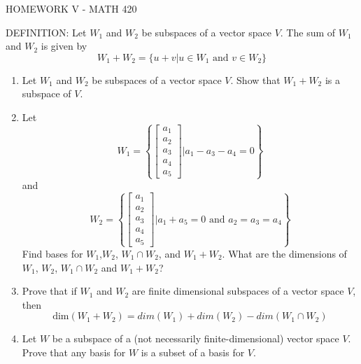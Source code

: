 \documentclass{article}
\begin{document}
\centerline{HOMEWORK V - MATH 420}
\noindent
DEFINITION:  Let $W_1$ and $W_2$ be subspaces of a vector space $V$.  The sum of $W_1$ and $W_2$ is given by $$W_1+W_2=\{u+v|u\in W_1 \mbox{ and } v\in W_2\}$$

\begin{enumerate}

\item
Let $W_1$ and $W_2$ be subspaces of a vector space $V$.  Show that $W_1+W_2$ is a subspace of $V$.
\item Let
$$W_1=\left\{\left[\begin{array}{c}a_1\\a_2\\a_3\\a_4\\a_5\end{array}\right] | a_1-a_3-a_4=0\right\}$$
and
$$W_2=\left\{\left[\begin{array}{c}a_1\\a_2\\a_3\\a_4\\a_5\end{array}\right] | a_1+a_5=0 \mbox{ and } a_2=a_3=a_4\right\}$$
Find bases for $W_1$,$W_2$, $W_1\cap W_2$, and $W_1+W_2$.
What are the dimensions of $W_1$, $W_2$, $W_1\cap W_2$ and $W_1+W_2$?

\item  Prove that if $W_1$ and $W_2$ are finite dimensional subspaces of a vector space $V$, then $$\mbox{dim}(W_1+W_2)=dim(W_1)+dim(W_2)-dim(W_1\cap W_2)$$

\item Let $W$ be a subspace of a (not necessarily finite-dimensional) vector space $V$. Prove that any basis for $W$ is a subset of a basis for $V$.

     \end{enumerate}
     
\end{document}
